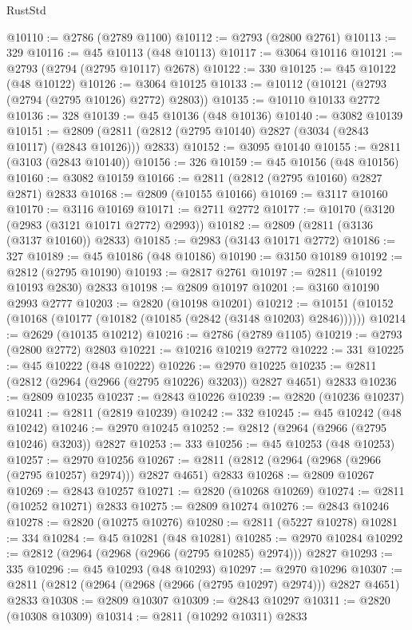 \begin{lexlean}{RustStd}
\begin{coremodule}
{\begin{coremodule}
{{{{{{{{{{{{{{{{{{{{{{{{{{{{{{{{{@10110 := @2786 (@2789 @1100)
@10112 := @2793 (@2800 @2761)
@10113 := 329
@10116 := @45 @10113 (@48 @10113)
@10117 := @3064 @10116
@10121 := @2793 (@2794 (@2795 @10117) @2678)
@10122 := 330
@10125 := @45 @10122 (@48 @10122)
@10126 := @3064 @10125
@10133 := @10112 (@10121 (@2793 (@2794 (@2795 @10126) @2772) @2803))
@10135 := @10110 @10133 @2772
@10136 := 328
@10139 := @45 @10136 (@48 @10136)
@10140 := @3082 @10139
@10151 := @2809 (@2811 (@2812 (@2795 @10140) @2827 (@3034 (@2843 @10117) (@2843 @10126))) @2833)
@10152 := @3095 @10140
@10155 := @2811 (@3103 (@2843 @10140))
@10156 := 326
@10159 := @45 @10156 (@48 @10156)
@10160 := @3082 @10159
@10166 := @2811 (@2812 (@2795 @10160) @2827 @2871) @2833
@10168 := @2809 (@10155 @10166)
@10169 := @3117 @10160
@10170 := @3116 @10169
@10171 := @2711 @2772
@10177 := @10170 (@3120 (@2983 (@3121 @10171 @2772) @2993))
@10182 := @2809 (@2811 (@3136 (@3137 @10160)) @2833)
@10185 := @2983 (@3143 @10171 @2772)
@10186 := 327
@10189 := @45 @10186 (@48 @10186)
@10190 := @3150 @10189
@10192 := @2812 (@2795 @10190)
@10193 := @2817 @2761
@10197 := @2811 (@10192 @10193 @2830) @2833
@10198 := @2809 @10197
@10201 := @3160 @10190 @2993 @2777
@10203 := @2820 (@10198 @10201)
@10212 := @10151 (@10152 (@10168 (@10177 (@10182 (@10185 (@2842 (@3148 @10203) @2846))))))
@10214 := @2629 (@10135 @10212)
@10216 := @2786 (@2789 @1105)
@10219 := @2793 (@2800 @2772) @2803
@10221 := @10216 @10219 @2772
@10222 := 331
@10225 := @45 @10222 (@48 @10222)
@10226 := @2970 @10225
@10235 := @2811 (@2812 (@2964 (@2966 (@2795 @10226) @3203)) @2827 @4651) @2833
@10236 := @2809 @10235
@10237 := @2843 @10226
@10239 := @2820 (@10236 @10237)
@10241 := @2811 (@2819 @10239)
@10242 := 332
@10245 := @45 @10242 (@48 @10242)
@10246 := @2970 @10245
@10252 := @2812 (@2964 (@2966 (@2795 @10246) @3203)) @2827
@10253 := 333
@10256 := @45 @10253 (@48 @10253)
@10257 := @2970 @10256
@10267 := @2811 (@2812 (@2964 (@2968 (@2966 (@2795 @10257) @2974))) @2827 @4651) @2833
@10268 := @2809 @10267
@10269 := @2843 @10257
@10271 := @2820 (@10268 @10269)
@10274 := @2811 (@10252 @10271) @2833
@10275 := @2809 @10274
@10276 := @2843 @10246
@10278 := @2820 (@10275 @10276)
@10280 := @2811 (@5227 @10278)
@10281 := 334
@10284 := @45 @10281 (@48 @10281)
@10285 := @2970 @10284
@10292 := @2812 (@2964 (@2968 (@2966 (@2795 @10285) @2974))) @2827
@10293 := 335
@10296 := @45 @10293 (@48 @10293)
@10297 := @2970 @10296
@10307 := @2811 (@2812 (@2964 (@2968 (@2966 (@2795 @10297) @2974))) @2827 @4651) @2833
@10308 := @2809 @10307
@10309 := @2843 @10297
@10311 := @2820 (@10308 @10309)
@10314 := @2811 (@10292 @10311) @2833
}}}}}}}}}}}}}}}}}}}}}}}}}}}}}}}}}
\end{coremodule}}
\end{coremodule}
\end{lexlean}
